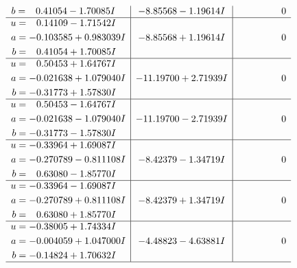\documentclass[1p]{elsarticle_modified}
\theoremstyle{definition}
\begin{document}
$$\begin{array}{c|c|c}
\begin{aligned}
b &= \phantom{-}0.41054 - 1.70085 I\end{aligned}
 & -8.85568 - 1.19614 I & \phantom{-0.000000 } 0 \\ \hline\begin{aligned}
u &= \phantom{-}0.14109 - 1.71542 I \\
a &= -0.103585 + 0.983039 I \\
b &= \phantom{-}0.41054 + 1.70085 I\end{aligned}
 & -8.85568 + 1.19614 I & \phantom{-0.000000 } 0 \\ \hline\begin{aligned}
u &= \phantom{-}0.50453 + 1.64767 I \\
a &= -0.021638 + 1.079040 I \\
b &= -0.31773 + 1.57830 I\end{aligned}
 & -11.19700 + 2.71939 I & \phantom{-0.000000 } 0 \\ \hline\begin{aligned}
u &= \phantom{-}0.50453 - 1.64767 I \\
a &= -0.021638 - 1.079040 I \\
b &= -0.31773 - 1.57830 I\end{aligned}
 & -11.19700 - 2.71939 I & \phantom{-0.000000 } 0 \\ \hline\begin{aligned}
u &= -0.33964 + 1.69087 I \\
a &= -0.270789 - 0.811108 I \\
b &= \phantom{-}0.63080 - 1.85770 I\end{aligned}
 & -8.42379 - 1.34719 I & \phantom{-0.000000 } 0 \\ \hline\begin{aligned}
u &= -0.33964 - 1.69087 I \\
a &= -0.270789 + 0.811108 I \\
b &= \phantom{-}0.63080 + 1.85770 I\end{aligned}
 & -8.42379 + 1.34719 I & \phantom{-0.000000 } 0 \\ \hline\begin{aligned}
u &= -0.38005 + 1.74334 I \\
a &= -0.004059 + 1.047000 I \\
b &= -0.14824 + 1.70632 I\end{aligned}
 & -4.48823 - 4.63881 I & \phantom{-0.000000 } 0\\
 \hline 
 \end{array}$$\newpage$$\begin{array}{c|c|c}  

\end{array}$$
\end{document}
